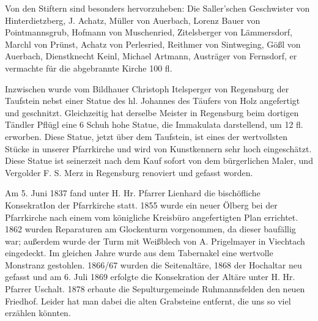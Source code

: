 \documentclass{book}
\begin{document}
Von den Stiftern sind besonders hervorzuheben: Die Saller'schen Geschwister von
Hinterdietzberg, J. Achatz, Müller von Auerbach, Lorenz Bauer von
Pointmannsgrub, Hofmann von Muschenried, Zitelsberger von Lämmersdorf, Marchl
von Prünst, Achatz von Perlesried, Reithmer von Sintweging, Gößl von Auerbach,
Dienstknecht Keinl, Michael Artmann, Austräger von Fernsdorf, er vermachte für
die abgebrannte Kirche 100 fl.

Inzwischen wurde vom Bildhauer Christoph Itelsperger von Regensburg der
Taufstein nebst einer Statue des hl. Johannes des Täufers von Holz angefertigt
und geschnitzt. Gleichzeitig hat derselbe Meister in Regensburg beim dortigen
Tändler Pflügl eine 6 Schuh hohe Statue, die Immakulata darstellend, um 12 fl.
erworben. Diese Statue, jetzt über dem Taufstein, ist eines der wertvollsten
Stücke in unserer Pfarrkirche und wird von Kunstkennern sehr hoch eingeschätzt.
Diese Statue ist seinerzeit nach dem Kauf sofort von dem bürgerlichen Maler, und
Vergolder F. S. Merz in Regensburg renoviert und gefasst worden.

Am 5. Juni 1837 fand unter H. Hr. Pfarrer Lienhard die bischöfliche KonsekratIon
der Pfarrkirche statt. 1855 wurde ein neuer Ölberg bei der Pfarrkirche nach
einem vom königliche Kreisbüro angefertigten Plan errichtet. 1862 wurden
Reparaturen am Glockenturm vorgenommen, da dieser baufällig war; außerdem wurde
der Turm mit Weißblech von A. Prigelmayer in Viechtach eingedeckt. Im gleichen
Jahre wurde aus dem Tabernakel eine wertvolle Monstranz gestohlen. 1866/67
wurden die Seitenaltäre, 1868 der Hochaltar neu gefasst und am 6. Juli 1869
erfolgte die Konsekration der Altäre unter H. Hr. Pfarrer Uschalt. 1878 erbaute
die Sepulturgemeinde Ruhmannsfelden den neuen Friedhof. Leider hat man dabei die
alten Grabsteine entfernt, die uns so viel erzählen könnten.
\end{document}
